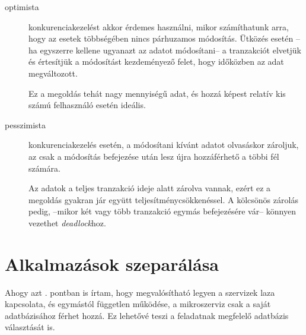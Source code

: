 \begin{description}
	\item[optimista] konkurenciakezelést akkor érdemes használni, mikor számíthatunk arra, hogy az esetek többségében nincs párhuzamos módosítás. Ütközés esetén --ha egyszerre kellene ugyanazt az adatot módosítani-- a tranzakciót elvetjük és értesítjük a módosítást kezdeményező felet, hogy időközben  az adat megváltozott.
	
	Ez a megoldás tehát nagy mennyiségű adat, és hozzá képest relatív kis számú felhasználó esetén ideális.
	
	\item[pesszimista] konkurenciakezelés esetén, a módosítani kívánt adatot olvasáskor zároljuk, az csak a módosítás befejezése után lesz újra hozzáférhető a többi fél számára.
	
	Az adatok a teljes tranzakció ideje alatt zárolva vannak, ezért ez a megoldás gyakran jár együtt teljesítménycsökkenéssel. A kölcsönös zárolás pedig, --mikor két vagy több tranzakció egymás befejezésére vár-- könnyen vezethet \textit{deadlock}hoz.
\end{description}


\section{Alkalmazások szeparálása}\label{sec:alkalmazasok_szeparalasa}
Ahogy azt . pontban is írtam, hogy megvalósítható legyen a szervizek laza kapcsolata, és egymástól független működése, a mikroszerviz csak a saját adatbázisához férhet hozzá. Ez lehetővé teszi a feladatnak megfelelő adatbázis választását is.

